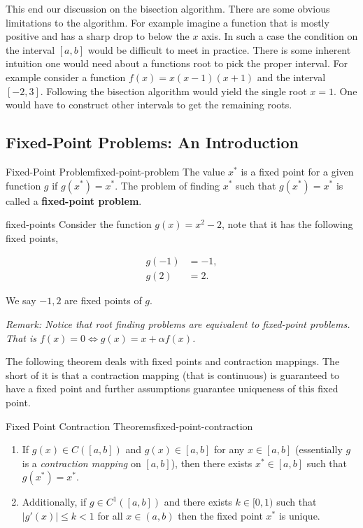 \documentclass[10pt]{article}
\begin{document}
This end our discussion on the bisection algorithm. There are some obvious limitations to the algorithm. For example imagine a function that is mostly positive and has a sharp drop to below the $x$ axis. In such a case the condition on the interval $[a,b]$ would be difficult to meet in practice. There is some inherent intuition one would need about a functions root to pick the proper interval. For example consider a function $f(x)=x(x-1)(x+1)$ and the interval $[-2,3]$. Following the bisection algorithm would yield the single root $x=1$. One would have to construct other intervals to get the remaining roots.


\subsection{Fixed-Point Problems: An Introduction}

\begin{mydefinition}{Fixed-Point Problem}{fixed-point-problem}
    The value $x^*$ is a fixed point for a given function $g$ if $g(x^*)=x^*$. The problem of finding $x^*$ such that $g(x^*)=x^{*}$ is called a \textbf{fixed-point problem}. 
\end{mydefinition}

\begin{myexample}{}{fixed-points}
    Consider the function $g(x)=x^{2}-2$, note that it has the following fixed points,

    \begin{align*}
        g(-1)&=-1, \\
        g(2) &=2.
    \end{align*}

    We say $-1,2$ are fixed points of $g$.
\end{myexample}


\textit{Remark: Notice that root finding problems are equivalent to fixed-point problems. That is $f(x)=0 \iff g(x)=x+\alpha f(x)$.}


The following theorem deals with fixed points and contraction mappings. The short of it is that a contraction mapping (that is continuous) is guaranteed to have a fixed point and further assumptions guarantee uniqueness of this fixed point.

\begin{mytheorem}{Fixed Point Contraction Theorems}{fixed-point-contraction}
    \begin{enumerate}
        \item If $g(x)\in C([a,b])$ and $g(x)\in [a,b]$ for any $x\in [a,b]$ (essentially $g$ is a \textit{contraction mapping} on $[a,b]$), then there exists $x^*\in [a,b]$ such that $g(x^*)=x^*$.
        \item Additionally, if $g\in C^{1}([a,b])$ and there exists $k\in [0,1)$ such that $|g'(x)|\leq k <1$ for all $x\in (a,b)$ then the fixed point $x^{*}$ is unique.
    \end{enumerate}
\end{mytheorem}
\end{document}
